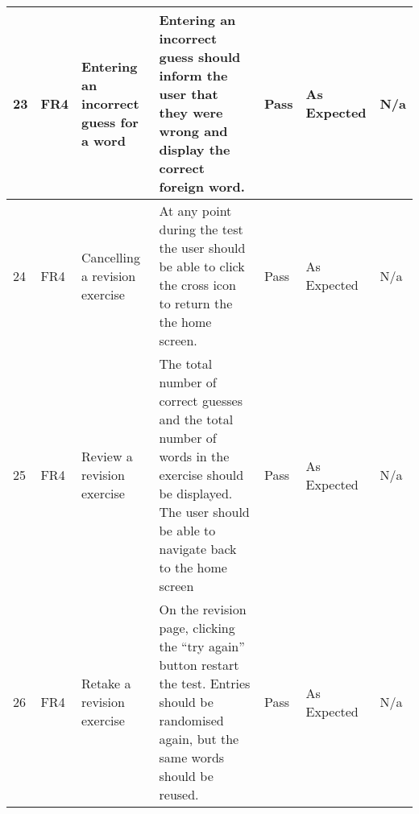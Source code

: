 \documentclass[paper=a4, fontsize=11pt]{scrartcl}	%
\numberwithin{equation}{section}															%
\numberwithin{figure}{section}																%
\numberwithin{table}{section}
\begin{document}
\begin{landscape}
\begin{longtable}{|l|p{2cm}|p{5cm}|p{5cm}|l|p{5cm}|p{5cm}|}
23 & FR4                    & Entering an incorrect guess for a word               & Entering an incorrect guess should inform the user that they were wrong and display the correct foreign word.                                                                                                                              & Pass      & As Expected                                        & N/a                                                                                                                                                                                                                        \\ \hline
24 & FR4                    & Cancelling a revision exercise                       & At any point during the test the user should be able to click the cross icon to return the the home screen.                                                                                                                                & Pass      & As Expected                                        & N/a                                                                                                                                                                                                                        \\ \hline
25 & FR4                    & Review a revision exercise                           & The total number of correct guesses and the total number of words in the exercise should be displayed. The user should be able to navigate back to the home screen                                                                         & Pass      & As Expected                                        & N/a                                                                                                                                                                                                                        \\ \hline
26 & FR4                    & Retake a revision exercise                           & On the revision page, clicking the “try again” button restart the test. Entries should be randomised again, but the same words should be reused.                                                                                           & Pass      & As Expected                                        & N/a                                                                                                                                                                                                                        \\ \hline

\end{longtable}
\end{landscape}
\end{document}
